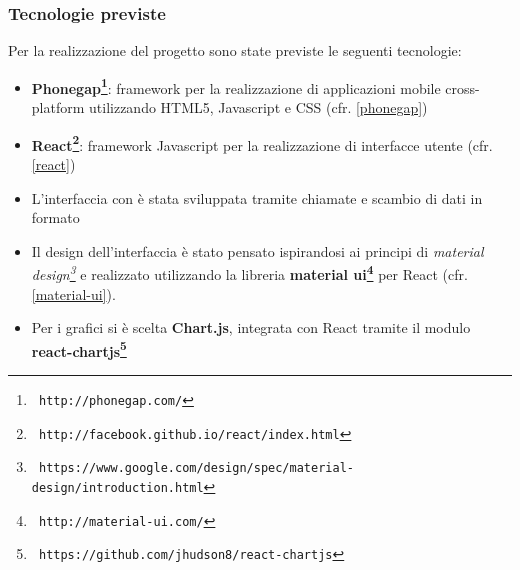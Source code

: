 \subsubsection{Tecnologie previste}
Per la realizzazione del progetto sono state previste le seguenti tecnologie:

\begin{itemize}
\item \textbf{Phonegap\footnote{\texttt{ http://phonegap.com/}}}: framework per 
la realizzazione di applicazioni mobile
cross-platform utilizzando HTML5, Javascript e CSS (cfr. \ref{phonegap})
\item \textbf{React\footnote{\texttt{ http://facebook.github.io/react/index.html}}}: 
framework Javascript per la realizzazione di interfacce utente (cfr. \ref{react})
\item L'interfaccia con \fiscoloWeb{} è stata sviluppata tramite chiamate  e
scambio di dati in formato 
\item Il design dell'interfaccia è stato pensato ispirandosi ai principi di
\textit{material design\footnote{\texttt{ https://www.google.com/design/spec/material-design/introduction.html}}} e 
realizzato utilizzando la libreria \textbf{material ui\footnote{\texttt{ http://material-ui.com/}}} per React (cfr. \ref{material-ui}).
\item Per i grafici si è scelta \textbf{Chart.js}, integrata con React tramite
il modulo \textbf{react-chartjs\footnote{\texttt{ https://github.com/jhudson8/react-chartjs}}}
\end{itemize}

